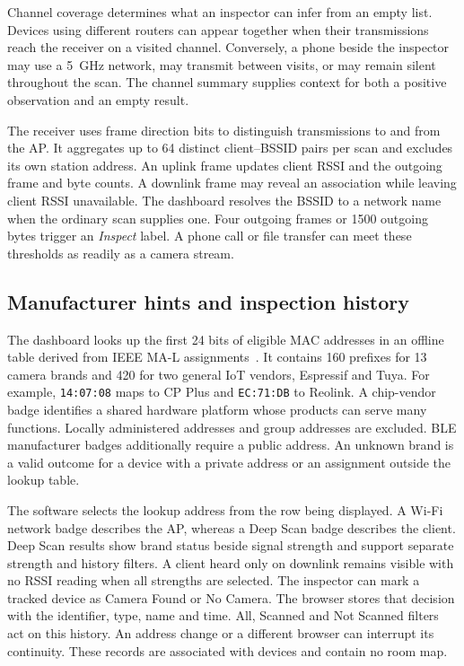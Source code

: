 \documentclass[conference]{IEEEtran}
\begin{document}
Channel coverage determines what an inspector can infer from an empty list. Devices using different routers can appear together when their transmissions reach the receiver on a visited channel. Conversely, a phone beside the inspector may use a 5~GHz network, may transmit between visits, or may remain silent throughout the scan. The channel summary supplies context for both a positive observation and an empty result.

The receiver uses frame direction bits to distinguish transmissions to and from the AP. It aggregates up to 64 distinct client--BSSID pairs per scan and excludes its own station address. An uplink frame updates client RSSI and the outgoing frame and byte counts. A downlink frame may reveal an association while leaving client RSSI unavailable. The dashboard resolves the BSSID to a network name when the ordinary scan supplies one. Four outgoing frames or 1500 outgoing bytes trigger an \emph{Inspect} label. A phone call or file transfer can meet these thresholds as readily as a camera stream.

\subsection{Manufacturer hints and inspection history}
The dashboard looks up the first 24 bits of eligible MAC addresses in an offline table derived from IEEE MA-L assignments~\cite{ieeeoui}. It contains 160 prefixes for 13 camera brands and 420 for two general IoT vendors, Espressif and Tuya. For example, \texttt{14:07:08} maps to CP Plus and \texttt{EC:71:DB} to Reolink. A chip-vendor badge identifies a shared hardware platform whose products can serve many functions. Locally administered addresses and group addresses are excluded. BLE manufacturer badges additionally require a public address. An unknown brand is a valid outcome for a device with a private address or an assignment outside the lookup table.

The software selects the lookup address from the row being displayed. A Wi-Fi network badge describes the AP, whereas a Deep Scan badge describes the client. Deep Scan results show brand status beside signal strength and support separate strength and history filters. A client heard only on downlink remains visible with no RSSI reading when all strengths are selected. The inspector can mark a tracked device as Camera Found or No Camera. The browser stores that decision with the identifier, type, name and time. All, Scanned and Not Scanned filters act on this history. An address change or a different browser can interrupt its continuity. These records are associated with devices and contain no room map.
\end{document}
